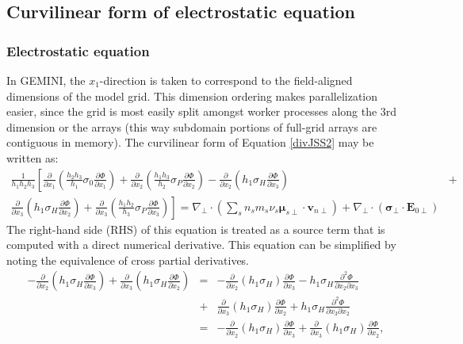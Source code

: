 \documentclass[11pt,letterpaper]{article}
\begin{document}
\subsection{Curvilinear form of electrostatic equation}

\subsubsection{Electrostatic equation}

In GEMINI, the $x_1$-direction is taken to correspond to the field-aligned dimensions of the model grid.  This dimension ordering makes parallelization easier, since the grid is most easily split amongst worker processes along the 3rd dimension or the arrays (this way subdomain portions of full-grid arrays are contiguous in memory). The curvilinear form of Equation \ref{divJSS2} may be written as:
\begin{eqnarray}
\frac{1}{h_1 h_2 h_3} \left[ \frac{\partial}{\partial x_1} \left( \frac{h_2 h_3}{h_1} \sigma_0 \frac{\partial \Phi}{\partial x_1} \right) + \frac{\partial}{\partial x_2} \left( \frac{h_1 h_3}{h_2} \sigma_P \frac{\partial \Phi}{\partial x_2} \right) - \frac{\partial}{\partial x_2} \left( h_1 \sigma_H \frac{\partial \Phi}{\partial x_3} \right) \right. &+& \nonumber \\ \left. \frac{\partial}{\partial x_3} \left( h_1 \sigma_H \frac{\partial \Phi}{\partial x_2} \right) + \frac{\partial}{\partial x_3} \left( \frac{h_1 h_2}{h_3} \sigma_P \frac{\partial \Phi}{\partial x_3} \right)
\right]  = \nabla_\perp \cdot \left( \sum_s n_s m_s \nu_s \boldsymbol{\mu}_{s\perp} \cdot \mathbf{v}_{n\perp} \right) + \nabla_\perp \cdot \left( \boldsymbol{\sigma}_\perp \cdot \mathbf{E}_{0\perp} \right)
\end{eqnarray}
The right-hand side (RHS) of this equation is treated as a source term that is computed with a direct numerical derivative.  This equation can be simplified by noting the equivalence of cross partial derivatives.  
\begin{eqnarray}
-\frac{\partial}{\partial x_2} \left( h_1 \sigma_H \frac{\partial \Phi}{\partial x_3} \right) + \frac{\partial}{\partial x_3} \left( h_1 \sigma_H \frac{\partial \Phi}{\partial x_2} \right) &=& -\frac{\partial}{\partial x_2} \left( h_1 \sigma_H \right) \frac{\partial \Phi}{\partial x_3} - h_1 \sigma_H \frac{\partial^2 \Phi}{\partial x_2 \partial x_3} \\ &+& \frac{\partial}{\partial x_3} \left( h_1 \sigma_H \right) \frac{\partial \Phi}{\partial x_2} + h_1 \sigma_H \frac{\partial^2 \Phi}{\partial x_3 \partial x_2} \nonumber \\ &=& -\frac{\partial}{\partial x_2} \left( h_1 \sigma_H \right) \frac{\partial \Phi}{\partial x_3} + \frac{\partial}{\partial x_3} \left( h_1 \sigma_H \right) \frac{\partial \Phi}{\partial x_2}, 
\end{eqnarray}
\end{document}
